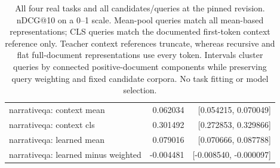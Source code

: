 \begin{table}[H]
\begin{tabularx}{\linewidth}{Yrr}
narrativeqa: context mean & 0.062034 & [0.054215, 0.070049] \\
narrativeqa: context cls & 0.301492 & [0.272853, 0.329866] \\
narrativeqa: learned mean & 0.079016 & [0.070666, 0.087788] \\
narrativeqa: learned minus weighted & -0.004481 & [-0.008540, -0.000097] \\
\bottomrule
\end{tabularx}
\caption{All four real tasks and all candidates/queries at the pinned revision. nDCG@10 on a 0--1 scale. Mean-pool queries match all mean-based representations; CLS queries match the documented first-token context reference only. Teacher context references truncate, whereas recursive and flat full-document representations use every token. Intervals cluster queries by connected positive-document components while preserving query weighting and fixed candidate corpora. No task fitting or model selection.}
\label{tab:longembed-review}
\end{table}
